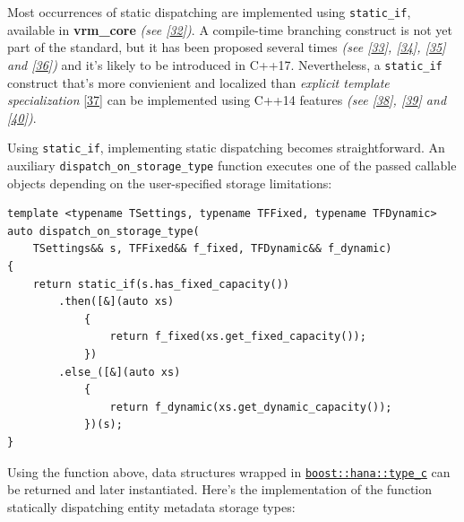 \documentclass[twoside, 12pt, a4paper, openany]{book}
\begin{document}
Most occurrences of static dispatching are implemented using
\texttt{static_if},
available in \textbf{vrm\_core} \emph{(see
{[}\protect\hyperlink{ref-github_vrmcore}{32}{]})}. A compile-time
branching construct is not yet part of the standard, but it has been
proposed several times \emph{(see
{[}\protect\hyperlink{ref-isocpp_sif0}{33}{]},
{[}\protect\hyperlink{ref-isocpp_sif1}{34}{]},
{[}\protect\hyperlink{ref-isocpp_sif2}{35}{]} and
{[}\protect\hyperlink{ref-isocpp_sif3}{36}{]})} and it's likely to be
introduced in C++17. Nevertheless, a
\texttt{static_if}
construct that's more convienient and localized than \emph{explicit
template specialization}
{[}\protect\hyperlink{ref-cppreference_ets}{37}{]} can be implemented
using C++14 features \emph{(see {[}\protect\hyperlink{ref-sif0}{38}{]},
{[}\protect\hyperlink{ref-sif1}{39}{]} and
{[}\protect\hyperlink{ref-sif2}{40}{]})}.

Using
\texttt{static_if},
implementing static dispatching becomes straightforward. An auxiliary
\texttt{dispatch_on_storage_type}
function executes one of the passed callable objects depending on the
user-specified storage limitations:

\begin{verbatim}
template <typename TSettings, typename TFFixed, typename TFDynamic>
auto dispatch_on_storage_type(
    TSettings&& s, TFFixed&& f_fixed, TFDynamic&& f_dynamic)
{
    return static_if(s.has_fixed_capacity())
        .then([&](auto xs)
            {
                return f_fixed(xs.get_fixed_capacity());
            })
        .else_([&](auto xs)
            {
                return f_dynamic(xs.get_dynamic_capacity());
            })(s);
}
\end{verbatim}

Using the function above, data structures wrapped in
\href{http://www.boost.org/doc/libs/1_61_0/libs/hana/doc/html/structboost_1_1hana_1_1type.html\#ae35139e732c4b75e91061513cf445628}{\texttt{boost::hana::type_c}}
can be returned and later instantiated. Here's the implementation of the
function statically dispatching entity metadata storage types:
\end{document}
